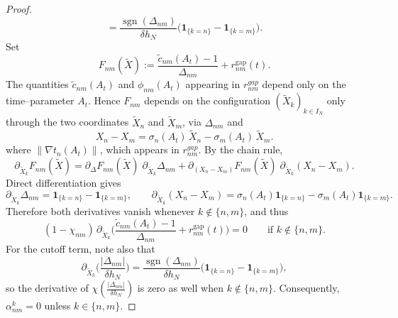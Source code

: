 \documentclass[12pt,reqno]{amsart}
\theoremstyle{plain}
\theoremstyle{definition}
\theoremstyle{remark}
\begin{document}
\begin{proof}
\begin{equation}
=\frac{\operatorname{sgn}(\Delta_{nm})}{\delta h_N}
\big(\mathbf{1}_{\{k=n\}}-\mathbf{1}_{\{k=m\}}\big).
\end{equation}
Set
\begin{equation}
F_{nm}(\widetilde X)
:= \frac{\widetilde c_{nm}(A_t)-1}{\Delta_{nm}}
   + r^{\mathrm{gap}}_{nm}(t).
\end{equation}
The quantities $\widetilde c_{nm}(A_t)$ and $\phi_{nm}(A_t)$ appearing in
$r^{gap}_{nm}$ depend only on the time–parameter $A_t$.
Hence $F_{nm}$ depends on the configuration $(\widetilde X_k)_{k\in I_N}$
only through the two coordinates $\widetilde X_n$ and $\widetilde X_m$, via
$\Delta_{nm}$ and
\begin{equation}
X_n-X_m=\sigma_n(A_t)\,\widetilde X_n-\sigma_m(A_t)\,\widetilde X_m .
\end{equation}
where $\big\|\nabla t_n(A_t) \big\|$, which appears in $r^{gap}_{nm}$. By the chain rule,
\begin{equation}
\partial_{\widetilde X_k}F_{nm}(\widetilde X)
=\partial_{\Delta}F_{nm}(\widetilde X)\;\partial_{\widetilde X_k}\Delta_{nm}
+\partial_{(X_n-X_m)}F_{nm}(\widetilde X)\;\partial_{\widetilde X_k}(X_n-X_m).
\end{equation}
Direct differentiation gives
\begin{equation}
\partial_{\widetilde X_k}\Delta_{nm}
=\mathbf 1_{\{k=n\}}-\mathbf 1_{\{k=m\}},
\qquad
\partial_{\widetilde X_k}(X_n-X_m)
=\sigma_n(A_t)\mathbf 1_{\{k=n\}}-\sigma_m(A_t)\mathbf 1_{\{k=m\}} .
\end{equation}
Therefore both derivatives vanish whenever $k\notin\{n,m\}$, and thus
\begin{equation}
(1-\chi_{nm})\,\partial_{\widetilde X_k}
\Big(\frac{\widetilde c_{nm}(A_t)-1}{\Delta_{nm}}+r^{\mathrm{gap}}_{nm}(t)\Big)=0
\qquad\text{if }k\notin\{n,m\}.
\end{equation}
For the cutoff term, note also that
\begin{equation}
\partial_{\widetilde X_k}\!\Big(\frac{|\Delta_{nm}|}{\delta h_N}\Big)
=\frac{\operatorname{sgn}(\Delta_{nm})}{\delta h_N}
\big(\mathbf 1_{\{k=n\}}-\mathbf 1_{\{k=m\}}\big),
\end{equation}
so the derivative of $\chi\!\left(\frac{|\Delta_{nm}|}{\delta h_N}\right)$
is zero as well when $k\notin\{n,m\}$. Consequently, $\alpha^k_{nm}=0$
unless $k\in\{n,m\}$.


\end{proof}
\end{document}
